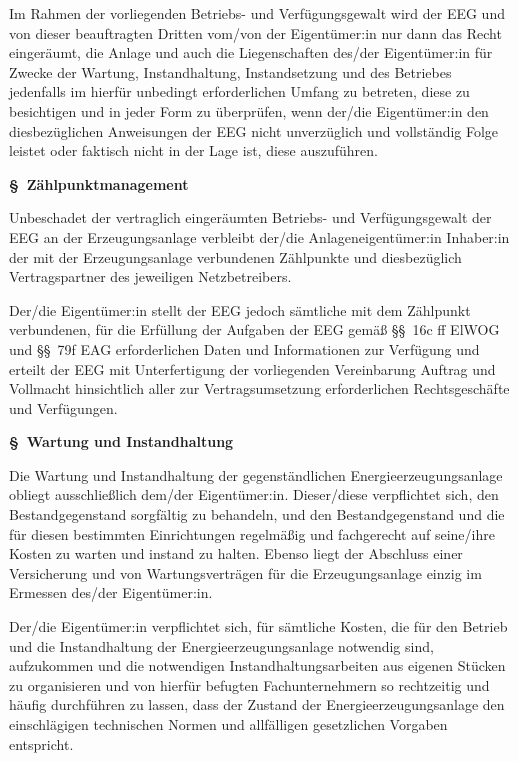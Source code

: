 \documentclass[a4paper,11pt]{article}
\newcounter{parasec}
\newcounter{parasubsec}[parasec]
\newcommand{\parasec}[1]{%
  \stepcounter{parasec}%
  \setcounter{parasubsec}{0}%
  \par\Needspace*{5\baselineskip}%
  \bigskip
  {\large\bfseries\color{tuerkis}\S\ \theparasec\quad #1}\par\nopagebreak
  \smallskip\nopagebreak
}
\begin{document}
Im Rahmen der vorliegenden Betriebs- und Verfügungsgewalt wird der EEG und von dieser beauftragten Dritten vom/von der Eigentümer:in nur dann das Recht eingeräumt, die Anlage und auch die Liegenschaften des/der Eigentümer:in für Zwecke der Wartung, Instandhaltung, Instandsetzung und des Betriebes jedenfalls im hierfür unbedingt erforderlichen Umfang zu betreten, diese zu besichtigen und in jeder Form zu überprüfen, wenn der/die Eigentümer:in den diesbezüglichen Anweisungen der EEG nicht unverzüglich und vollständig Folge leistet oder faktisch nicht in der Lage ist, diese auszuführen.

\parasec{Zählpunktmanagement}

Unbeschadet der vertraglich eingeräumten Betriebs- und Verfügungsgewalt der EEG an der Erzeugungsanlage verbleibt der/die Anlageneigentümer:in Inhaber:in der mit der Erzeugungsanlage verbundenen Zählpunkte und diesbezüglich Vertragspartner des jeweiligen Netzbetreibers.

Der/die Eigentümer:in stellt der EEG jedoch sämtliche mit dem Zählpunkt verbundenen, für die Erfüllung der Aufgaben der EEG gemäß \S\S\ 16c ff ElWOG und \S\S\ 79f EAG erforderlichen Daten und Informationen zur Verfügung und erteilt der EEG mit Unterfertigung der vorliegenden Vereinbarung Auftrag und Vollmacht hinsichtlich aller zur Vertragsumsetzung erforderlichen Rechtsgeschäfte und Verfügungen.

\parasec{Wartung und Instandhaltung}

Die Wartung und Instandhaltung der gegenständlichen Energieerzeugungsanlage obliegt ausschließlich dem/der Eigentümer:in. Dieser/diese verpflichtet sich, den Bestandgegenstand sorgfältig zu behandeln, und den Bestandgegenstand und die für diesen bestimmten Einrichtungen regelmäßig und fachgerecht auf seine/ihre Kosten zu warten und instand zu halten. Ebenso liegt der Abschluss einer Versicherung und von Wartungsverträgen für die Erzeugungsanlage einzig im Ermessen des/der Eigentümer:in.

Der/die Eigentümer:in verpflichtet sich, für sämtliche Kosten, die für den Betrieb und die Instandhaltung der Energieerzeugungsanlage notwendig sind, aufzukommen und die notwendigen Instandhaltungsarbeiten aus eigenen Stücken zu organisieren und von hierfür befugten Fachunternehmern so rechtzeitig und häufig durchführen zu lassen, dass der Zustand der Energieerzeugungsanlage den einschlägigen technischen Normen und allfälligen gesetzlichen Vorgaben entspricht.
\end{document}
